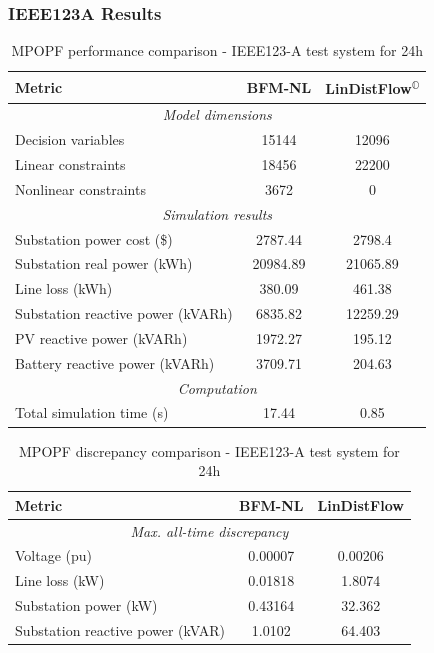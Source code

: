 \subsubsection{IEEE123A Results}

\begin{table}[H]
    \centering
    \caption{MPOPF performance comparison - IEEE123-A test system for 24h}
    \label{table:mpopf-tradeoffs-opt-ieee123a}
    \begin{tabular}{|l|c|c|}
    \hline
    \textbf{Metric} & \textbf{BFM-NL} & \textbf{LinDistFlow\textsuperscript{\(\mathbb{O}\)}} \\ \hline
    \multicolumn{3}{|c|}{\textit{Model dimensions}} \\ \hline
    Decision variables & {15144} & {12096} \\ \hline
    Linear constraints & {18456} & {22200} \\ \hline
    Nonlinear constraints & {3672} & {0} \\ \hline
    \multicolumn{3}{|c|}{\textit{Simulation results}} \\ \hline
    Substation power cost (\$) & 2787.44 & 2798.4 \\ \hline
    Substation real power (kWh) & 20984.89 & 21065.89 \\ \hline
    Line loss (kWh) & 380.09 & 461.38 \\ \hline
    Substation reactive power (kVARh) & 6835.82 & 12259.29 \\ \hline
    PV reactive power (kVARh) & 1972.27 & 195.12 \\ \hline
    Battery reactive power (kVARh) & 3709.71 & 204.63 \\ \hline
    \multicolumn{3}{|c|}{\textit{Computation}} \\ \hline
    Total simulation time (s) & 17.44 & 0.85 \\ \hline
    \end{tabular}
\end{table}

\begin{table}[H]
    \centering
    \caption{MPOPF discrepancy comparison - IEEE123-A test system for 24h}
    \label{table:mpopf-tradeoffs-feas-ieee123a}
    \begin{tabular}{|l|c|c|}
    \hline
    \textbf{Metric} & \textbf{BFM-NL} & \textbf{LinDistFlow} \\ \hline
    \multicolumn{3}{|c|}{\textit{Max. all-time discrepancy}} \\ \hline
    Voltage (pu) & 0.00007 & 0.00206 \\ \hline
    Line loss (kW) & 0.01818 & 1.8074 \\ \hline
    Substation power (kW) & 0.43164 & 32.362 \\ \hline
    Substation reactive power (kVAR) & 1.0102 & 64.403 \\ \hline
    \end{tabular}
\end{table}

